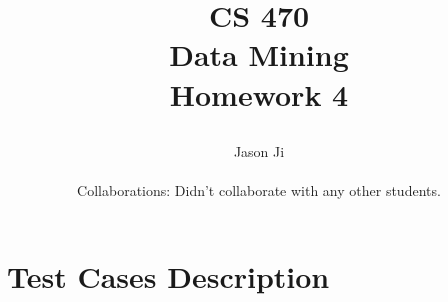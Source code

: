 \documentclass[9pt,twoside]{exam}
\begin{document}
\title{\begin{tcolorbox} \begin{center}{CS 470\\ 
\vspace{0.5cm}
Data Mining\\
\vspace{0.5cm}
Homework 4\\
 } \end{center}
 \end{tcolorbox}}
 \author{ 
 Jason Ji \\\\
Collaborations: Didn't collaborate with any other students.}
 \date{  }
 \maketitle
\pagestyle{myheadings}
\thispagestyle{plain}
\vspace{-0.5cm}







\newcommand{\bi}{\mathbf{i}}
\newcommand{\bbb}{\mathbf{b}}



\section*{Test Cases Description}
\end{document}
